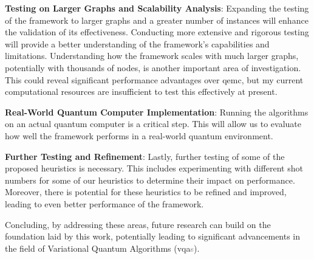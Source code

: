 \noindent\textbf{Testing on Larger Graphs and Scalability Analysis}: Expanding the testing of the framework to larger graphs and a greater number of instances will enhance the validation of its effectiveness. Conducting more extensive and rigorous testing will provide a better understanding of the framework's capabilities and limitations. Understanding how the framework scales with much larger graphs, potentially with thousands of nodes, is another important area of investigation. This could reveal significant performance advantages over \acrshort{qemc}, but my current computational resources are insufficient to test this effectively at present.
\vspace{5mm}

\noindent\textbf{Real-World Quantum Computer Implementation}: Running the algorithms on an actual quantum computer is a critical step. This will allow us to evaluate how well the framework performs in a real-world quantum environment.
\vspace{5mm}

\noindent\textbf{Further Testing and Refinement}: Lastly, further testing of some of the proposed heuristics is necessary. This includes experimenting with different shot numbers for some of our heuristics to determine their impact on performance. Moreover, there is potential for these heuristics to be refined and improved, leading to even better performance of the framework.
\vspace{5mm}

Concluding, by addressing these areas, future research can build on the foundation laid by this work, potentially leading to significant advancements in the field of Variational Quantum Algorithms (\acrshort{vqa}\textcolor{gray}{s}).


